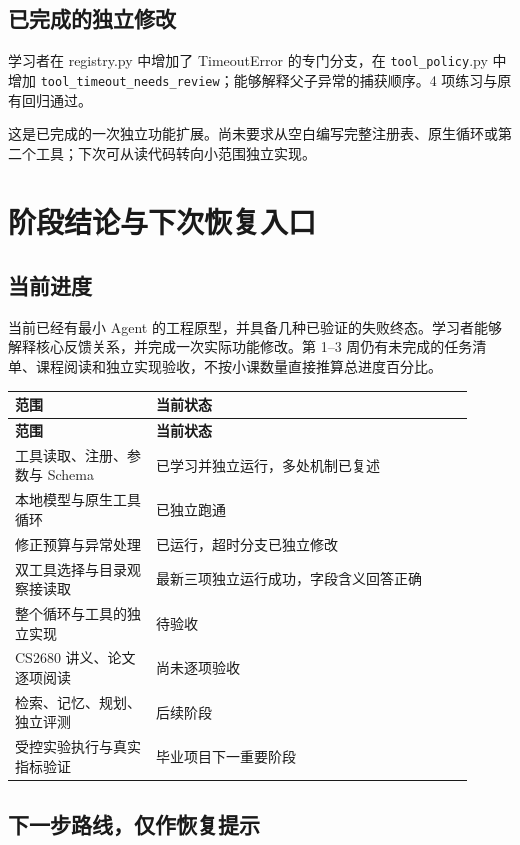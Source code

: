 \documentclass[UTF8,zihao=-4,fontset=fandol]{ctexart}
\begin{document}
\subsection{已完成的独立修改}

学习者在 registry.py 中增加了 TimeoutError 的专门分支，在 \nolinkurl{tool_policy}.py 中增加 \nolinkurl{tool_timeout_needs_review}；能够解释父子异常的捕获顺序。4 项练习与原有回归通过。

这是已完成的一次独立功能扩展。尚未要求从空白编写完整注册表、原生循环或第二个工具；下次可从读代码转向小范围独立实现。

\section{阶段结论与下次恢复入口}

\subsection{当前进度}

当前已经有最小 Agent 的工程原型，并具备几种已验证的失败终态。学习者能够解释核心反馈关系，并完成一次实际功能修改。第 1–3 周仍有未完成的任务清单、课程阅读和独立实现验收，不按小课数量直接推算总进度百分比。

{\small\setlength{\tabcolsep}{4pt}
\renewcommand{\arraystretch}{1.25}
\begin{longtable}{>{\raggedright\arraybackslash}p{0.28\linewidth}>{\raggedright\arraybackslash}p{0.63\linewidth}}
\toprule
\textbf{范围} & \textbf{当前状态} \\
\midrule\endfirsthead
\toprule
\textbf{范围} & \textbf{当前状态} \\
\midrule\endhead
\bottomrule\endfoot
工具读取、注册、参数与 Schema & 已学习并独立运行，多处机制已复述 \\
本地模型与原生工具循环 & 已独立跑通 \\
修正预算与异常处理 & 已运行，超时分支已独立修改 \\
双工具选择与目录观察接读取 & 最新三项独立运行成功，字段含义回答正确 \\
整个循环与工具的独立实现 & 待验收 \\
CS2680 讲义、论文逐项阅读 & 尚未逐项验收 \\
检索、记忆、规划、独立评测 & 后续阶段 \\
受控实验执行与真实指标验证 & 毕业项目下一重要阶段 \\
\end{longtable}}

\subsection{下一步路线，仅作恢复提示}
\end{document}
